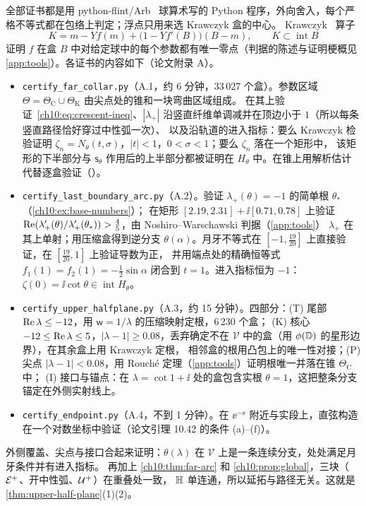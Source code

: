 全部证书都是用 python-flint/Arb~\cite{Johansson2017Arb} 球算术写的 Python 程序，外向舍入，每个严格不等式都在包络上判定；浮点只用来选 Krawczyk 盒的中心。
Krawczyk~\cite{Krawczyk1969} 算子
\[
  K=m-Yf(m)+\bigl(1-Yf'(B)\bigr)(B-m),\qquad K\subset\operatorname{int}B
\]
证明 $f$ 在盒 $B$ 中对给定球中的每个参数都有唯一零点（判据的陈述与证明梗概见 \cref{app:tools}）。各证书的内容如下（论文附录 A）。
\begin{itemize}
\item \texttt{certify\_far\_collar.py}（A.1，约 6 分钟，33\,027 个盒）。参数区域 $\Theta=\Theta_{\mathrm C}\cup\Theta_{\mathrm K}$ 由尖点处的锥和一块弯曲区域组成。
  在其上验证~\eqref{ch10:eq:crescent-ineq}、$|\lambda_+|$ 沿竖直纤维单调减并在顶边小于 $1$（所以每条竖直路径恰好穿过中性弧一次）、
  以及沿轨道的进入指标：要么 Krawczyk 检验证明 $\zeta_n=N_\theta(t,\sigma)$，$|t|<1$，$0<\sigma<1$；要么 $\zeta_n$ 落在一个矩形中，
  该矩形的下半部分与 $\mathsf s_\theta$ 作用后的上半部分都被证明在 $H_\theta$ 中。在锥上用解析估计代替逐盒验证（\cite[引理~10.28]{KneserPaper}）。
\item \texttt{certify\_last\_boundary\_arc.py}（A.2）。验证 $\lambda_+(\theta)=-1$ 的简单根 $\theta_*$（\cref{ch10:ex:base-numbers}）；
  在矩形 $[2.19,2.31]+\ii[0.71,0.78]$ 上验证 $\operatorname{Re}(\lambda_+'(\theta)/\lambda_+'(\theta_*))>\tfrac45$，由 Noshiro--Warschawski 判据（\cref{app:tools}）
  $\lambda_+$ 在其上单射；用压缩盒得到逆分支 $\theta(\alpha)$。月牙不等式在 $[-1,\tfrac{19}{20}]$ 上直接验证，在 $[\tfrac{19}{20},1]$ 上验证导数为正，
  并用端点处的精确恒等式 $f_1(1)=f_2(1)=-\tfrac12\sin\alpha$ 闭合到 $t=1$。进入指标恒为 $-1$：$\zeta(0)=\ii\cot\theta\in\operatorname{int}H_\theta$。
\item \texttt{certify\_upper\_halfplane.py}（A.3，约 15 分钟）。四部分：(T) 尾部 $\operatorname{Re}\lambda\le-12$，用 $\mathsf w=1/\lambda$ 的压缩映射定根，6\,230 个盒；
  (K) 核心 $-12\le\operatorname{Re}\lambda\le5$，$|\lambda-1|\ge0.08$，丢弃确定不在 $\mathcal V$ 中的盒（用 $\phi(\mathbb{D})$ 的星形边界），在其余盒上用 Krawczyk 定根，
  相邻盒的根用凸包上的唯一性对接；(P) 尖点 $|\lambda-1|<0.08$，用 Rouché 定理（\cref{app:tools}）证明根唯一并落在锥 $\Theta_{\mathrm C}$ 中；
  (I) 接口与锚点：在 $\lambda=\cot1+\ii$ 处的盒包含实根 $\theta=1$，这把整条分支锚定在外侧实射线上。
\item \texttt{certify\_endpoint.py}（A.4，不到 1 分钟）。在 $\ee^{-\ee}$ 附近与实段上，直弦构造在一个对数坐标中验证（论文引理 10.42 的条件 (a)--(f)）。
\end{itemize}
外侧覆盖、尖点与接口合起来证明：$\theta(\lambda)$ 在 $\mathcal V$ 上是一条连续分支，处处满足月牙条件并有进入指标。
再加上 \cref{ch10:thm:far-arc} 和 \cref{ch10:prop:global}，三块（$\mathcal E^{+}$、开中性弧、$\mathcal U^{+}$）在重叠处一致，
$\mathbb{H}$ 单连通，所以延拓与路径无关。这就是 \cref{thm:upper-half-plane}(1)(2)。

